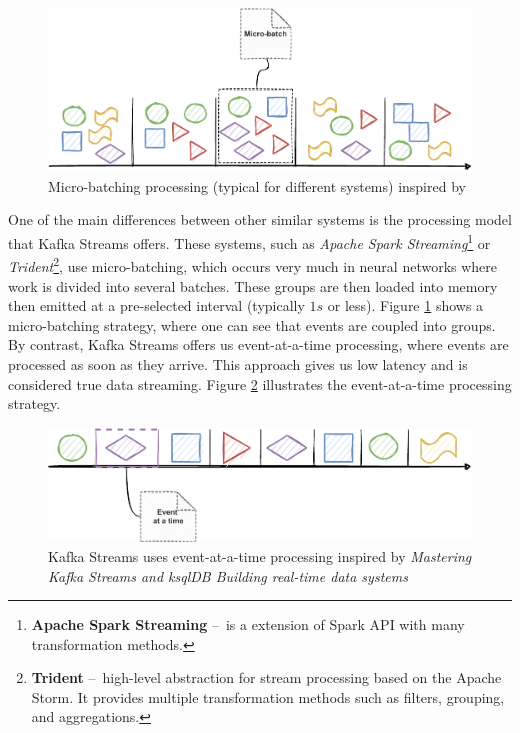 \begin{figure}[!ht]
    \centering
    \includegraphics[scale=0.78]{obrazky-figures/02-preliminaries/02-kafka/10-kafkaStreamsProces.pdf}
    \caption{Micro-batching processing (typical for different systems) inspired by \cite{kafkaStreamsBook}}
    \label{fig:02-kafkaStreamsProcessingBatch}
\end{figure}

One of the main differences between other similar systems is the processing model that Kafka Streams offers. These systems, such as \emph{Apache Spark Streaming}\footnote{\textbf{Apache Spark Streaming} \---\ is a extension of Spark API with many transformation methods.} or \emph{Trident}\footnote{\textbf{Trident} \---\ high-level abstraction for stream processing based on the Apache Storm. It provides multiple transformation methods such as filters, grouping, and aggregations.}, use micro-batching, which occurs very much in neural networks where work is divided into several batches. These groups are then loaded into memory then emitted at a pre-selected interval (typically $1s$ or less). Figure \ref{fig:02-kafkaStreamsProcessingBatch} shows a micro-batching strategy, where one can see that events are coupled into groups. By contrast, Kafka Streams offers us event-at-a-time processing, where events are processed as soon as they arrive. This approach gives us low latency and is considered true data streaming. Figure \ref{fig:02-kafkaStreamsProcessingEvent} illustrates the event-at-a-time processing strategy.
\begin{figure}[!ht]
    \centering
    \includegraphics[scale=0.88]{obrazky-figures/02-preliminaries/02-kafka/11-kafkaStreamsProces2.pdf}
    \caption{Kafka Streams uses event-at-a-time processing inspired by \emph{Mastering Kafka Streams and ksqlDB Building real-time data systems} \cite{kafkaStreamsBook}}
    \label{fig:02-kafkaStreamsProcessingEvent}
\end{figure}

